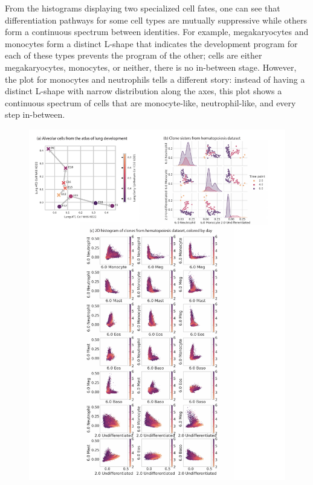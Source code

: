 \documentclass[aps,superscriptaddress, notitlepage,longbibliography]{revtex4-1}
\begin{document}
From the histograms displaying two specialized cell fates, one can see that differentiation pathways for some cell types are mutually suppressive while others form a continuous spectrum between identities. For example, megakaryocytes and monocytes form a distinct L-shape that indicates the development program for each of these types prevents the program of the other; cells are either megakaryocytes, monocytes, or neither, there is no in-between stage. However, the plot for monocytes and neutrophils tells a different story: instead of having a distinct L-shape with narrow distribution along the axes, this plot shows a continuous spectrum of cells that are monocyte-like, neutrophil-like, and every step in-between. 


\begin{figure}
	\centering
		\includegraphics[scale=0.5]{figs/fig4.pdf}

\end{figure}
\end{document}
